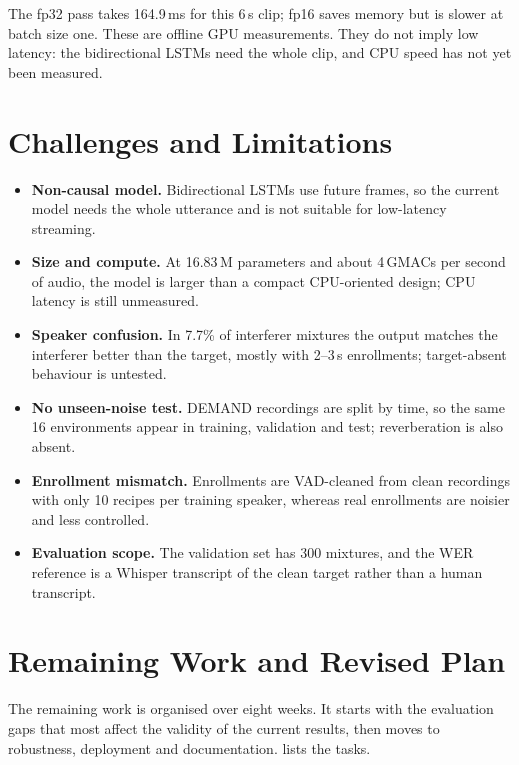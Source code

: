 \documentclass[11pt,a4paper]{article}
\begin{document}
The fp32 pass takes 164.9\,ms for this 6\,s clip; fp16 saves memory but is slower at batch size
one. These are offline GPU measurements. They do not imply low latency: the bidirectional LSTMs
need the whole clip, and CPU speed has not yet been measured.

\section{Challenges and Limitations}
\label{sec:limits}
\begin{itemize}
  \item \textbf{Non-causal model.} Bidirectional LSTMs use future frames, so the current model
        needs the whole utterance and is not suitable for low-latency streaming.
  \item \textbf{Size and compute.} At 16.83\,M parameters and about 4\,GMACs per second of audio,
        the model is larger than a compact CPU-oriented design; CPU latency is still unmeasured.
  \item \textbf{Speaker confusion.} In 7.7\% of interferer mixtures the output matches the
        interferer better than the target, mostly with 2--3\,s enrollments; target-absent
        behaviour is untested.
  \item \textbf{No unseen-noise test.} DEMAND recordings are split by time, so the same 16
        environments appear in training, validation and test; reverberation is also absent.
  \item \textbf{Enrollment mismatch.} Enrollments are VAD-cleaned from clean recordings with only
        10 recipes per training speaker, whereas real enrollments are noisier and less controlled.
  \item \textbf{Evaluation scope.} The validation set has 300 mixtures, and the WER reference is a
        Whisper transcript of the clean target rather than a human transcript.
\end{itemize}

\section{Remaining Work and Revised Plan}
\label{sec:remaining}
The remaining work is organised over eight weeks. It starts with the evaluation gaps that most
affect the validity of the current results, then moves to robustness, deployment and
documentation.  lists the tasks.
\end{document}
